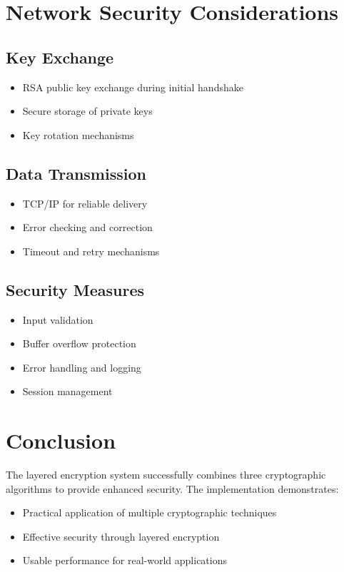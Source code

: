 \documentclass[12pt,a4paper]{article}
\begin{document}
\section{Network Security Considerations}
\subsection{Key Exchange}
\begin{itemize}
    \item RSA public key exchange during initial handshake
    \item Secure storage of private keys
    \item Key rotation mechanisms
\end{itemize}

\subsection{Data Transmission}
\begin{itemize}
    \item TCP/IP for reliable delivery
    \item Error checking and correction
    \item Timeout and retry mechanisms
\end{itemize}

\subsection{Security Measures}
\begin{itemize}
    \item Input validation
    \item Buffer overflow protection
    \item Error handling and logging
    \item Session management
\end{itemize}

\section{Conclusion}
The layered encryption system successfully combines three cryptographic algorithms to provide enhanced security. The implementation demonstrates:

\begin{itemize}
    \item Practical application of multiple cryptographic techniques
    \item Effective security through layered encryption
    \item Usable performance for real-world applications
\end{itemize}
\end{document}

